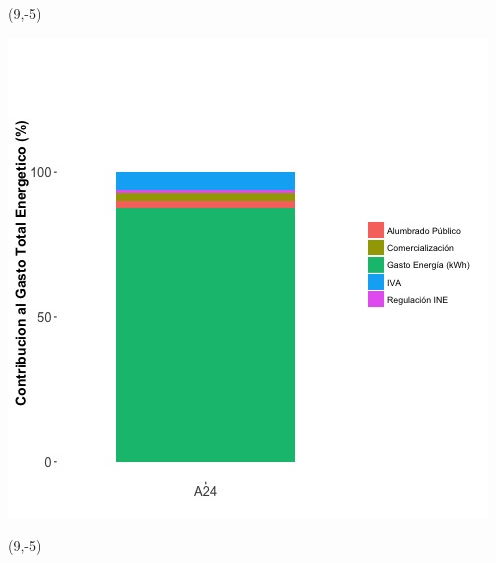 \documentclass{article}\usepackage[]{graphicx}\usepackage[]{color}
\newenvironment{knitrout}{}{} %
\begin{document}
 \begin{textblock}{1}(9,-5)
\begin{minipage}{20em}
\begingroup

\endgroup
\end{minipage}
\end{textblock}

\begin{knitrout}
\color{fgcolor}
\includegraphics[scale=0.65]{figure/A24_costvars_plot.jpg} 
\end{knitrout}

 \begin{textblock}{1}(9,-5)
\begin{minipage}{20em}
\begingroup

\endgroup
\end{minipage}
\end{textblock}
\end{document}

